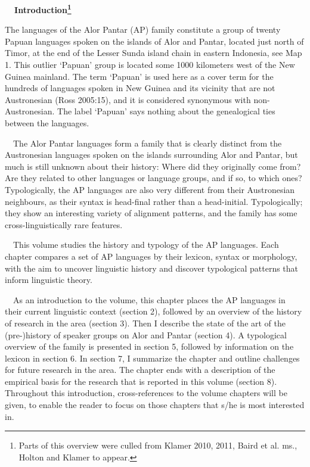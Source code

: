 {\bfseries
\ \ \hypertarget{Toc376957260}{}Introduction\footnote{Parts of this overview were culled from Klamer 2010, 2011, Baird et al. ms., Holton and Klamer to appear. }}

The languages of the Alor Pantar (AP) family constitute a group of twenty Papuan languages spoken on the islands of Alor and Pantar, located just north of Timor, at the end of the Lesser Sunda island chain in eastern Indonesia, see Map 1. This outlier {\textquoteleft}Papuan{\textquoteright} group is located some 1000 kilometers west of the New Guinea mainland. The term {\textquoteleft}Papuan{\textquoteright} is used here as a cover term for the hundreds of languages spoken in New Guinea and its vicinity that are not Austronesian (Ross 2005:15), and it is considered synonymous with non-Austronesian. The label {\textquoteleft}Papuan{\textquoteright} says nothing about the genealogical ties between the languages. 

\ \ The Alor Pantar languages form a family that is clearly distinct from the Austronesian languages spoken on the islands surrounding Alor and Pantar, but much is still unknown about their history: Where did they originally come from? Are they related to other languages or language groups, and if so, to which ones? Typologically, the AP languages are also very different from their Austronesian neighbours, as their syntax is head-final rather than a head-initial. Typologically; they show an interesting variety of alignment patterns, and the family has some cross-linguistically rare features.  

\ \ This volume studies the history and typology of the AP languages. Each chapter compares a set of AP languages by their lexicon, syntax or morphology, with the aim to uncover linguistic history and discover typological patterns that inform linguistic theory. 

\ \ As an introduction to the volume, this chapter places the AP languages in their current linguistic context (section 2), followed by an overview of the history of research in the area (section 3). Then I describe the state of the art of the (pre-)history of speaker groups on Alor and Pantar (section 4). A typological overview of the family is presented in section 5, followed by information on the lexicon in section 6. In section 7, I summarize the chapter and outline challenges for future research in the area. The chapter ends with a description of the empirical basis for the research that is reported in this volume (section 8). Throughout this introduction, cross-references to the volume chapters will be given, to enable the reader to focus on those chapters that s/he is most interested in. 

